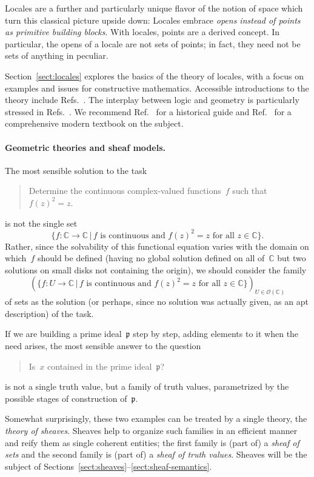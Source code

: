 \documentclass{ws-rv9x6}
\renewcommand{\O}{\mathcal{O}}
\newcommand{\CC}{\mathbb{C}}
\newcommand{\ppp}{\mathfrak{p}}
\renewcommand{\_}{\mathpunct{.}}
\newcommand{\?}{\,{:}\,}
\begin{document}
Locales are a further and particularly unique flavor of the notion of space
which turn this classical picture upside down: Locales embrace \emph{opens
instead of points as primitive building blocks}. With locales, points are a
derived concept. In particular, the opens of a locale are not sets of points;
in fact, they need not be sets of anything in peculiar.

Section~\ref{sect:locales} explores the basics of the theory of locales, with a
focus on examples and issues for constructive mathematics. Accessible
introductions to the theory include
Refs.~. The interplay between logic and
geometry is particularly stressed in
Refs.~. We recommend
Ref.~ for a historical guide and
Ref.~ for a comprehensive modern
textbook on the subject.


\paragraph{Geometric theories and sheaf models.} The most sensible solution to
the task
\begin{quote}
Determine the continuous complex-valued functions~$f$ such that~$f(z)^2 = z$.
\end{quote}
is not the single set
\[ \{ f : \CC \to \CC \,|\, \text{$f$ is continuous and $f(z)^2 = z$ for all~$z \in \CC$} \}. \]
Rather, since the solvability of this functional equation varies with the
domain on which~$f$ should be defined (having no global solution defined on all
of~$\CC$ but two solutions on small disks not containing the origin), we should
consider the family
\[ (\{ f : U \to \CC \,|\, \text{$f$ is continuous and $f(z)^2 = z$ for all~$z
\in \CC$} \})_{U \in \O(\CC)} \]
of sets as the solution (or perhaps, since no solution was actually given, as
an apt description) of the task.

If we are building a prime ideal~$\ppp$ step by step, adding elements to it
when the need arises, the most sensible answer to the question
\begin{quote}
Is~$x$ contained in the prime ideal~$\ppp$?
\end{quote}
is not a single truth value, but a family of truth values, parametrized by the
possible stages of construction of~$\ppp$.

Somewhat surprisingly, these two examples can be treated by a single theory,
the \emph{theory of sheaves}. Sheaves help to organize such families in an
efficient manner and reify them as single coherent entities; the first family
is (part of) a \emph{sheaf of sets} and the second family is (part of) a
\emph{sheaf of truth values}. Sheaves will be the subject of
Sections~\ref{sect:sheaves}--\ref{sect:sheaf-semantics}.
\end{document}
